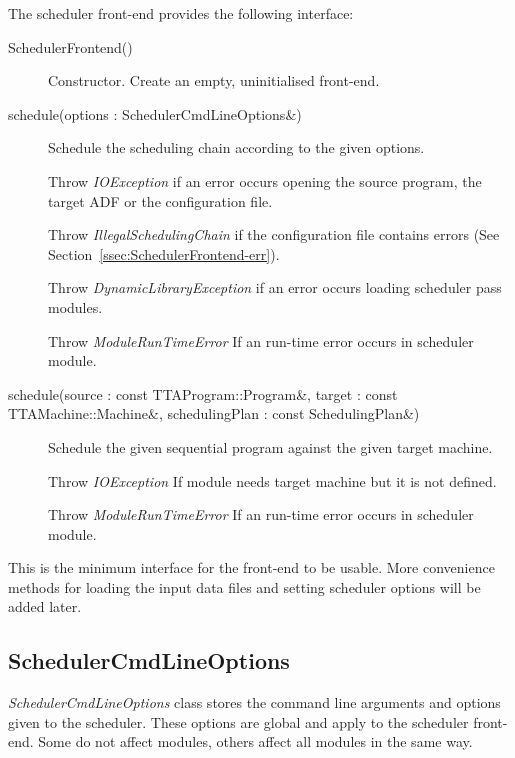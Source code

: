 \documentclass[a4paper,twoside]{tce}
\begin{document}
The scheduler front-end provides the following interface:

\begin{description}
\item[SchedulerFrontend()]
  Constructor. Create an empty, uninitialised front-end.

\item[schedule(options : SchedulerCmdLineOptions\&)]
  Schedule the scheduling chain according to the given options.

  Throw \emph{IOException} if an error occurs opening the source
  program, the target ADF or the configuration file.

  Throw \emph{IllegalSchedulingChain} if the configuration file
  contains errors (See Section~\ref{ssec:SchedulerFrontend-err}).

  Throw \emph{DynamicLibraryException} if an error occurs loading
  scheduler pass modules.

  Throw \emph{ModuleRunTimeError} If an run-time error occurs in scheduler
  module.

\item[schedule(source : const TTAProgram::Program\&,
  target : const TTAMachine::Machine\&,
  schedulingPlan : const SchedulingPlan\&)]
  Schedule the given sequential program against the given target
  machine.

  Throw \emph{IOException} If module needs target machine but it is not
  defined.

  Throw \emph{ModuleRunTimeError} If an run-time error occurs in scheduler
  module.

\end{description}

This is the minimum interface for the front-end to be usable. More
convenience methods for loading the input data files and setting
scheduler options will be added later.

\subsection{SchedulerCmdLineOptions}
\label{ssec:SchedulerCmdLineOptions-if}

\emph{SchedulerCmdLineOptions} class stores the command line arguments and
options given to the scheduler. These options are global and apply to the
scheduler front-end. Some do not affect modules, others affect all modules
in the same way.
\end{document}
